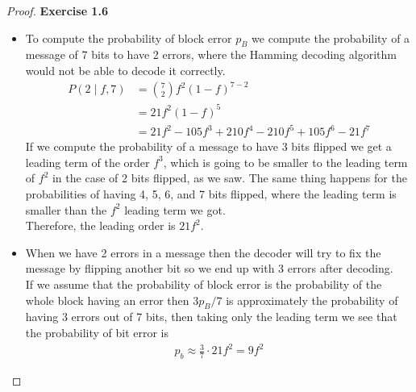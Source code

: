 \documentclass[11pt]{article}
\theoremstyle{definition}
\begin{document}
\cleardoublepage
\begin{proof}{\textbf{Exercise 1.6}}\\
\begin{itemize}
\item [(a)] To compute the probability of block error $p_B$ we compute the
probability of a message of 7 bits to have 2 errors, where the Hamming decoding
algorithm would not be able to decode it correctly.
\begin{align*}
    P(2\mid f,7) &= \binom{7}{2}f^{2}(1 - f)^{7-2} \\
    &= 21f^2(1 - f)^5\\
    &= 21 f^2 - 105 f^3 + 210 f^4 - 210 f^5 + 105 f^6 - 21 f^7
\end{align*}
If we compute the probability of a message to have 3 bits flipped we get a
leading term of the order $f^3$, which is going to be smaller to the leading
term of $f^2$ in the case of 2 bits flipped, as we saw.
The same thing happens for the probabilities of having 4, 5, 6, and 7 bits
flipped, where the leading term is smaller than the $f^2$ leading term we got.
\\
Therefore, the leading order is $21f^2$.
\item [(b)] When we have 2 errors in a message then the decoder will try to
fix the message by flipping another bit so we end up with 3 errors after
decoding.
\\
If we assume that the probability of block error is the probability of the
whole block having an error then $3p_B / 7$ is approximately the probability
of having 3 errors out of 7 bits, then taking only the leading term we see that
the probability of bit error is
\begin{align*}
    p_b \approx \frac{3}{7}\cdot 21f^2 = 9f^2
\end{align*}

\end{itemize}
\end{proof}
\end{document}
